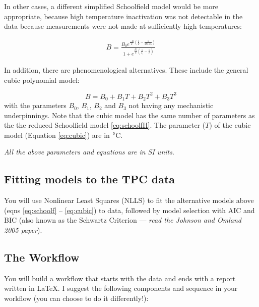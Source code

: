 In other cases, a different simplified Schoolfield model would be more 
appropriate, because high temperature inactivation was not detectable 
in the data because measurements were not made at sufficiently high 
temperatures:

\begin{equation} \label{eq:schoolfLo}
	\begin{aligned}
	  B = \frac{B_0 e^{\frac{-E}{k} (\frac{1}{T} - \frac{1}{283.15})}}
    { 1 +  e^{\frac{E_l}{k} (\frac{1}{T_l} - \frac{1}{T})}}
	\end{aligned}
\end{equation}

In addition, there are phenomenological alternatives. These include the 
general cubic polynomial model:

\begin{equation}\label{eq:cubic}
	B = B_0 + B_1 T + B_2 T^2 + B_3 T^3
\end{equation}
with the parameters $B_0$, $B_1$, $B_2$ and $B_3$ not having any 
mechanistic underpinnings. Note that the cubic model has the same 
number of parameters as the the reduced Schoolfield model 
\ref{eq:schoolfH}. The parameter ($T$) of the cubic model (Equation 
\ref{eq:cubic}) are in $\degree$C.

{\it All the above parameters and equations are in SI units}.

\subsection {Fitting models to the TPC data}

You will use Nonlinear Least Squares (NLLS) to fit the alternative 
models above (eqns \ref{eq:schoolf} -- \ref{eq:cubic}) to data, 
followed by model selection with AIC and BIC (also known as the 
Schwartz Criterion --- {\it read the Johnson and Omland 2005 paper}).
 
\subsection {The Workflow}

You will build a workflow that starts with the data and ends with a 
report written in \LaTeX. I suggest the following components and 
sequence in your workflow (you can choose to do it differently!):

